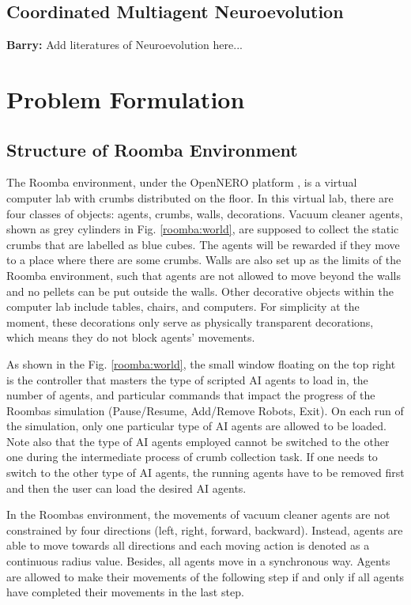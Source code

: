\documentclass[conference]{IEEEtran}
\begin{document}
\subsection{Coordinated Multiagent Neuroevolution}
\textbf{Barry:}
Add literatures of Neuroevolution here...

\section{Problem Formulation}

\subsection{Structure of Roomba Environment}
The Roomba environment, under the OpenNERO platform \cite{karpov2008opennero},
is a virtual computer lab with crumbs distributed on the floor.
In this virtual lab, there are four classes of objects: agents, crumbs, walls,
decorations. 
Vacuum cleaner agents, shown as grey cylinders in Fig. \ref{roomba:world}, are
supposed to collect the static crumbs that are labelled as blue cubes.  
The agents will be rewarded if they move to a place where there are some
crumbs. 
Walls are also set up as the limits of the Roomba environment, such that
agents are not allowed to move beyond the walls and no pellets can be put
outside the walls.
Other decorative objects within the computer lab include tables, chairs, and
computers. For simplicity at the moment, these decorations only serve as
physically transparent decorations, which means they do not block agents' movements.

As shown in the Fig. \ref{roomba:world}, the small window floating on the top right
is the controller that masters the type of scripted AI agents to load in, the
number of agents, and particular commands that impact the progress of the
Roombas simulation (Pause/Resume, Add/Remove Robots, Exit). On each run of the
simulation, only one particular type of AI agents are allowed to be loaded.
Note also that the type of AI agents employed cannot be switched to the other
one during the intermediate process of crumb collection task. 
If one needs to switch to the other type of AI agents, the running agents have
to be removed first and then the user can load the desired AI agents.

In the Roombas environment, the movements of vacuum cleaner agents are not
constrained by four directions (left, right, forward, backward). Instead,
agents are able to move towards all directions and each moving action is
denoted as a continuous radius value. Besides, all agents move in a
synchronous way. Agents are allowed to make their movements of the following
step if and only if all agents have completed their movements in the last step.
\end{document}
